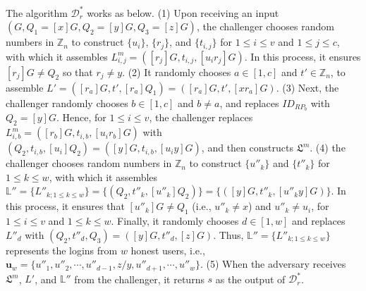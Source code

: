The algorithm $\mathcal{D}^*_r$ works as below. (1) Upon receiving an input $(G, Q_1=[x]G, Q_2=[y]G, Q_3=[z]G)$, %
the challenger
chooses random numbers in $\mathbb{Z}_n$ to construct $\{u_i\}$, $\{r_j\}$, and $\{t_{i, j}\}$ for $1 \le i \le v$ and $1 \le j \le c$, with which it assembles $L^m_{i, j}=([r_j]G, t_{i,j}, [u_ir_j]G)$.
In this process, it ensures $[r_{j}]G \neq Q_2$ so that $r_j \neq y$.  %
(2) It randomly chooses $a \in [1, c]$ and $t' \in \mathbb{Z}_n$, to assemble $L' = ([r_{a}]G, t', [r_{a}]Q_1) = ([r_{a}]G, t', [xr_{a}]G)$.
(3)
Next, the challenger randomly chooses $b \in [1, c]$ and $b \neq a$, and replaces $ID_{RP_b}$ with $Q_2 = [y]G$.
Hence, for $1 \le i \le v$, the challenger replaces $L^m_{i, b}=([r_b]G, t_{i,b}, [u_ir_b]G)$ with $(Q_2, t_{i,b}, [u_i]Q_2) = ([y]G, t_{i,b}, [u_iy]G)$, and then constructs $\mathfrak{L}^m$.
(4) the challenger chooses random numbers in $\mathbb{Z}_n$ to construct $\{u''_k\}$ and $\{t''_k\}$ for $1 \leq k \leq w$,
 with which it assembles $\mathbb{L}'' = \{L''_{k; 1\leq k \leq w}\} = \{(Q_2, t''_k, [u''_k]Q_2)\} = \{([y]G, t''_k, [u''_ky]G)\}$.
In this process, it ensures that $[u''_k]G \neq Q_1$ (i.e., $u''_k \neq x$) and $u''_k \neq u_i$,
 for $1 \le i \le v$ and $1 \le k \le w$.
Finally, it randomly chooses $d \in [1, w]$ and replaces $L''_{d}$ with $(Q_2, t''_d, Q_3) = ([y]G, t''_d, [z]G)$.
 Thus, $\mathbb{L}'' = \{L''_{k;1\leq k \leq w}\}$ represents the logins from $w$ honest users, i.e., $\mathbf{u}_w=\{u''_1, u''_2, \cdots, u''_{d-1}, z/y, u''_{d+1}, \cdots, u''_w\}$. (5) When the adversary receives $\mathfrak{L}^m$, $L'$, and $\mathbb{L}''$ from the challenger, it returns $s$ as the output of $\mathcal{D}^*_r$.

